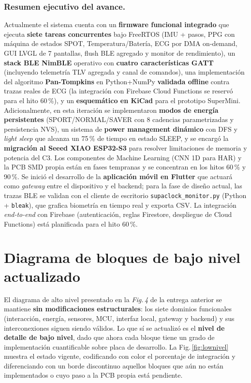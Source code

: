 \documentclass[letterpaper,11pt]{article}
\newcommand{\rfigura}[1]{Fig.\,\ref{#1}}
\begin{document}
\subsubsection{Resumen ejecutivo del avance.} Actualmente el sistema cuenta con un
\textbf{firmware funcional integrado} que ejecuta \textbf{siete tareas concurrentes} bajo FreeRTOS
(IMU + pasos, PPG con máquina de estados SPOT, Temperatura/Batería, ECG por DMA on-demand,
GUI LVGL de 7 pantallas, flush BLE agregado y monitor de rendimiento), un \textbf{stack BLE NimBLE}
operativo con \textbf{cuatro características GATT} (incluyendo telemetría TLV agregada y canal de
comandos), una implementación del algoritmo \textbf{Pan-Tompkins} en Python+NumPy
\textbf{validada offline} contra trazas reales de ECG (la integración con Firebase Cloud
Functions se reservó para el hito 60\,\%), y un \textbf{esquemático en KiCad} para el
prototipo SuperMini.
Adicionalmente, en esta iteración se implementaron \textbf{modos de energía persistentes}
(SPORT/NORMAL/SAVER con 8 cadencias parametrizadas y persistencia NVS), un sistema de
\textbf{power management dinámico} con DFS y \textit{light sleep} que alcanza un 75\,\% de
tiempo en estado SLEEP, y se encargó la \textbf{migración al Seeed XIAO ESP32-S3} para resolver
limitaciones de memoria y potencia del C3.
Los componentes de Machine Learning (CNN 1D para HAR) y la PCB SMD propia están en fases
tempranas y se concentran en los hitos 60\,\% y 90\,\%. Se inició el desarrollo de la
\textbf{aplicación móvil en Flutter} que actuará como \textit{gateway} entre el dispositivo y
el backend; para la fase de diseño actual, las trazas BLE se validan con el cliente de
escritorio \texttt{supaclock\_monitor.py} (Python + \texttt{bleak}), que grafica biometría
en tiempo real y exporta CSV. La integración \textit{end-to-end} con Firebase
(autenticación, reglas Firestore, despliegue de Cloud Functions) está planificada para el
hito 60\,\%.

\section{Diagrama de bloques de bajo nivel actualizado}
El diagrama de alto nivel presentado en la \textit{Fig.\,4} de la entrega anterior se mantiene
\textbf{sin modificaciones estructurales}: los siete dominios funcionales (interacción, energía,
sensores, MCU, interfaz local, gateway y backend) y sus interconexiones siguen siendo válidos.
Lo que sí se actualizó es el \textbf{nivel de detalle de bajo nivel}, dado que ahora cada bloque
tiene un grado de implementación cuantificable sobre placa de desarrollo. La \rfigura{fig:lownivel}
muestra el estado vigente, codificando con color el porcentaje de integración y diferenciando con un
borde discontinuo aquellos bloques que aún no están implementados o cuyo paso a la PCB propia
está pendiente.
\end{document}
